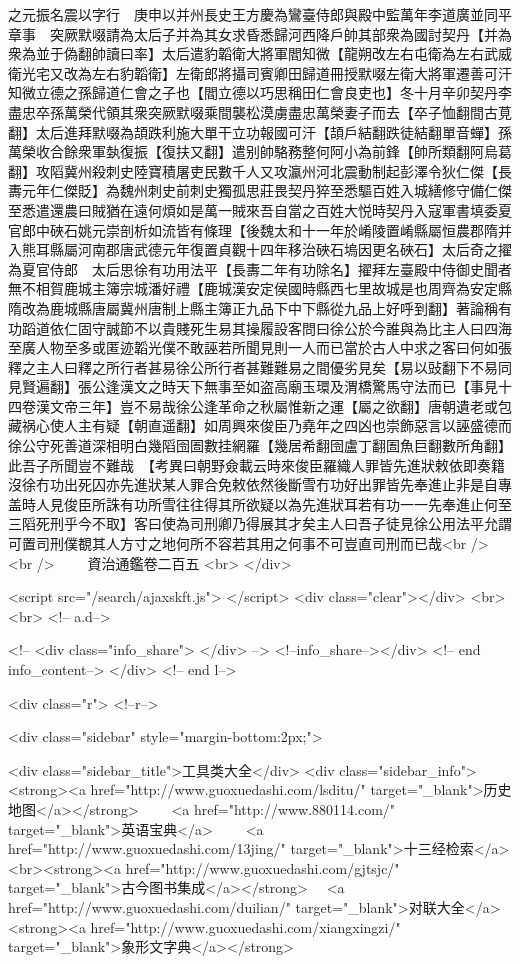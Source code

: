 之元振名震以字行　庚申以并州長史王方慶為鸞臺侍郎與殿中監萬年李道廣並同平章事　突厥默啜請為太后子并為其女求昏悉歸河西降戶帥其部衆為國討契丹【并為衆為並于偽翻帥讀曰率】太后遣豹韜衛大將軍閻知微【龍朔改左右屯衛為左右武威衛光宅又改為左右豹韜衛】左衛郎將攝司賓卿田歸道冊授默啜左衛大將軍遷善可汗知微立德之孫歸道仁會之子也【閻立德以巧思稱田仁會良吏也】冬十月辛卯契丹李盡忠卒孫萬榮代領其衆突厥默啜乘間襲松漠虜盡忠萬榮妻子而去【卒子恤翻間古莧翻】太后進拜默啜為頡跌利施大單干立功報國可汗【頡戶結翻跌徒結翻單音蟬】孫萬榮收合餘衆軍埶復振【復扶又翻】遣别帥駱務整何阿小為前鋒【帥所類翻阿烏葛翻】攻䧟冀州殺刺史陸寶積屠吏民數千人又攻瀛州河北震動制起彭澤令狄仁傑【長夀元年仁傑貶】為魏州刺史前刺史獨孤思莊畏契丹猝至悉驅百姓入城繕修守備仁傑至悉遣還農曰賊猶在遠何煩如是萬一賊來吾自當之百姓大悦時契丹入寇軍書填委夏官郎中硤石姚元崇剖析如流皆有條理【後魏太和十一年於崤陵置崤縣屬恒農郡隋并入熊耳縣屬河南郡唐武德元年復置貞觀十四年移治硤石塢因更名硤石】太后奇之擢為夏官侍郎　太后思徐有功用法平【長夀二年有功除名】擢拜左臺殿中侍御史聞者無不相賀鹿城主簿宗城潘好禮【鹿城漢安定侯國時縣西七里故城是也周齊為安定縣隋改為鹿城縣唐屬冀州唐制上縣主簿正九品下中下縣從九品上好呼到翻】著論稱有功蹈道依仁固守誠節不以貴賤死生易其操履設客問曰徐公於今誰與為比主人曰四海至廣人物至多或匿迹韜光僕不敢誣若所聞見則一人而已當於古人中求之客曰何如張釋之主人曰釋之所行者甚易徐公所行者甚難難易之間優劣見矣【易以䜴翻下不易同見賢遍翻】張公逢漢文之時天下無事至如盗高廟玉環及渭橋驚馬守法而已【事見十四卷漢文帝三年】豈不易哉徐公逢革命之秋屬惟新之運【屬之欲翻】唐朝遺老或包藏祸心使人主有疑【朝直遥翻】如周興來俊臣乃堯年之四凶也崇飾惡言以誣盛德而徐公守死善道深相明白幾䧟囹圄數挂網羅【幾居希翻囹盧丁翻圄魚巨翻數所角翻】此吾子所聞豈不難哉　【考異曰朝野僉載云時來俊臣羅織人罪皆先進狀敕依即奏籍沒徐冇功出死囚亦先進狀某人罪合免敕依然後斷雪冇功好出罪皆先奉進止非是自專盖時人見俊臣所誅有功所雪往往得其所欲疑以為先進狀耳若有功一一先奉進止何至三䧟死刑乎今不取】客曰使為司刑卿乃得展其才矣主人曰吾子徒見徐公用法平允謂可置司刑僕覩其人方寸之地何所不容若其用之何事不可豈直司刑而已哉<br />
<br />
　　資治通鑑卷二百五  <br>
   </div> 

<script src="/search/ajaxskft.js"> </script>
 <div class="clear"></div>
<br>
<br>
 <!-- a.d-->

 <!--
<div class="info_share">
</div> 
-->
 <!--info_share--></div>   <!-- end info_content-->
  </div> <!-- end l-->

<div class="r">   <!--r-->



<div class="sidebar"  style="margin-bottom:2px;">

 
<div class="sidebar_title">工具类大全</div>
<div class="sidebar_info">
<strong><a href="http://www.guoxuedashi.com/lsditu/" target="_blank">历史地图</a></strong>　　
<a href="http://www.880114.com/" target="_blank">英语宝典</a>　　
<a href="http://www.guoxuedashi.com/13jing/" target="_blank">十三经检索</a>　
<br><strong><a href="http://www.guoxuedashi.com/gjtsjc/" target="_blank">古今图书集成</a></strong>　
<a href="http://www.guoxuedashi.com/duilian/" target="_blank">对联大全</a>　<strong><a href="http://www.guoxuedashi.com/xiangxingzi/" target="_blank">象形文字典</a></strong>　

